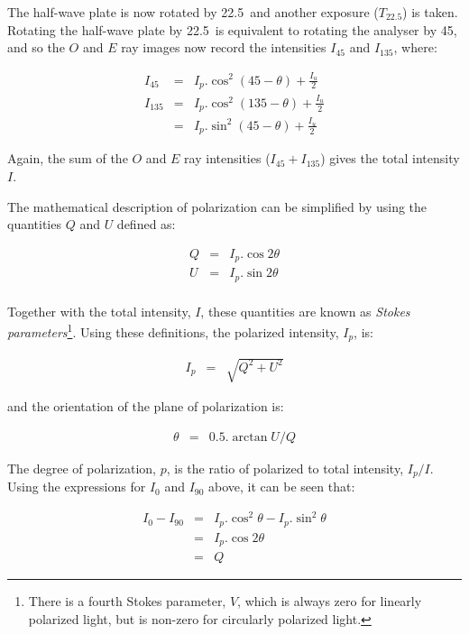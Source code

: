 The half-wave plate is now rotated by 22.5\dgs\ and another exposure
($T_{22.5}$) is taken. Rotating the half-wave plate by 22.5\dgs\ is
equivalent to rotating the analyser by 45\dgs, and so the $O$ and $E$ ray
images now record the intensities $I_{45}$ and $I_{135}$, where:
\begin{myquote}
\begin{eqnarray*}
  I_{45} & = & I_{p}.\cos^{2}(45 - \theta) + \frac{I_{u}}{2} \\
 I_{135} & = & I_{p}.\cos^{2}(135 - \theta) + \frac{I_{u}}{2} \\
         & = & I_{p}.\sin^{2}(45 - \theta) + \frac{I_{u}}{2}
\end{eqnarray*}
\end{myquote}

Again, the sum of the $O$ and $E$ ray intensities ($I_{45}+I_{135}$)
gives the total intensity $I$. 

The mathematical description of polarization can be simplified by using 
the quantities $Q$ and $U$ defined as:
\begin{myquote}
\begin{eqnarray*}
  Q & = & I_{p}.\cos 2\theta \\
  U & = & I_{p}.\sin 2\theta \\
\end{eqnarray*}
\end{myquote}

Together with the total intensity, $I$, these quantities are known as 
{\em Stokes parameters}\footnote{There is a fourth Stokes parameter, $V$, which is
always zero for linearly polarized light, but is non-zero for circularly
polarized light.}. Using these definitions, the polarized intensity, $I_{p}$, 
is:
\begin{myquote}
\begin{eqnarray*}
  I_{p} & = & \sqrt{ Q^{2} + U^{2} }
\end{eqnarray*}
\end{myquote}

and the orientation of the plane of polarization is:
\begin{myquote}
\begin{eqnarray*}
  \theta & = & 0.5.\arctan U/Q
\end{eqnarray*}
\end{myquote}

The degree of polarization, $p$, is the ratio of polarized to total
intensity, $I_{p}/I$. Using the expressions for $I_{0}$ and $I_{90}$
above, it can be seen that:
\begin{myquote}
\begin{eqnarray*}
  I_{0} - I_{90} & = & I_{p}.\cos^{2}\theta - I_{p}.\sin^{2}\theta \\
                 & = & I_{p}.\cos 2\theta \\
                 & = & Q
\end{eqnarray*}
\end{myquote}

